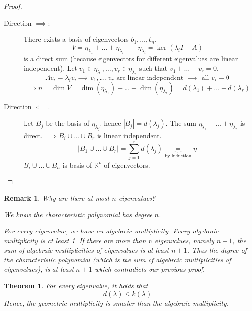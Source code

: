 \documentclass{article}
\newtheorem{theorem}{Theorem}  \numberwithin{theorem}{section}
\newtheorem{remark}{Remark}  \numberwithin{remark}{section}
\newcommand{\card}[1]{\left|#1\right|}
\begin{document}
\begin{proof} \hfill{}
  \begin{description}
    \item[Direction $\implies$:]
      There exists a basis of eigenvectors $b_1, \dots, b_n$.
      \[ V = \eta_{\lambda_1} + \dots + \eta_{\lambda_r} \qquad \eta_{\lambda_i} = \ker(\lambda_i I - A) \]
      is a direct sum (because eigenvectors for different eigenvalues are linear independent).
      Let $v_1 \in \eta_{\lambda_1}, \dots, v_r \in \eta_{\lambda_r}$ such that $v_1 + \dots + v_r = 0$.
      \[ A v_i = \lambda_i v_i \implies v_1, \dots, v_r \text{ are linear independent } \implies \text{ all } v_i = 0 \]
      \[ \implies n = \dim{V} = \dim(\eta_{\lambda_1}) + \dots + \dim(\eta_{\lambda_r}) = d(\lambda_1) + \dots + d(\lambda_r) \]
    \item[Direction $\impliedby$.]
      Let $B_j$ be the basis of $\eta_{\lambda_j}$, hence $\card{B_j} = d(\lambda_j)$.
      The sum $\eta_{\lambda_1} + \dots + \eta_{\lambda_r}$ is direct.
      $\implies B_i \cup \dots \cup B_r$ is linear independent.
      \[ \card{B_1 \cup \dots \cup B_r} = \sum_{j=1}^r d(\lambda_j) \underbrace{=}_{\text{by induction}} \eta \]
      $B_i \cup \dots \cup B_n$ is basis of $\mathbb K^n$ of eigenvectors.
  \end{description}
\end{proof}

\begin{remark}
  Why are there at most $n$ eigenvalues?

  We know the characteristic polynomial has degree $n$.

  For every eigenvalue, we have an algebraic multiplicity. Every algebraic multiplicity is at least 1.
  If there are more than $n$ eigenvalues, namely $n+1$, the sum of algebraic multiplicities of eigenvalues is at least $n+1$.
  Thus the degree of the characteristic polynomial (which is the sum of algebraic multiplicities of eigenvalues), is at least $n+1$ which contradicts our previous proof.
\end{remark}

\begin{theorem} %
  For every eigenvalue, it holds that
  \[ d(\lambda) \leq k(\lambda) \]
  Hence, the geometric multiplicity is smaller than the algebraic multiplicity.
\end{theorem}
\end{document}

